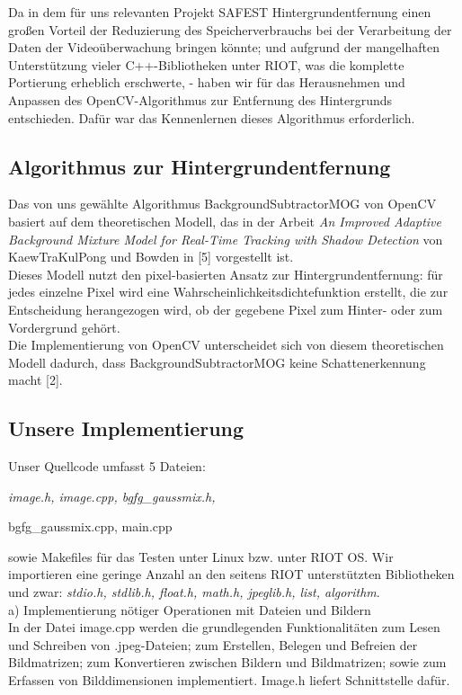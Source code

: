 \documentclass[10pt,a4paper]{article}
\begin{document}
Da in dem für uns relevanten Projekt SAFEST Hintergrundentfernung einen großen Vorteil der Reduzierung des Speicherverbrauchs bei der Verarbeitung der Daten der Videoüberwachung bringen könnte; und aufgrund der mangelhaften Unterstützung vieler C++-Bibliotheken unter RIOT, was die komplette Portierung erheblich erschwerte, - haben wir für das Herausnehmen und Anpassen des OpenCV-Algorithmus zur Entfernung des Hintergrunds entschieden. Dafür war das Kennenlernen dieses Algorithmus erforderlich. 

\subsection{Algorithmus zur Hintergrundentfernung}

Das von uns gewählte Algorithmus BackgroundSubtractorMOG von OpenCV basiert auf dem theoretischen Modell, das in der Arbeit {\it An Improved Adaptive Background Mixture Model for Real-Time Tracking with Shadow Detection} von KaewTraKulPong und Bowden in [5] vorgestellt ist. \\

Dieses Modell nutzt den pixel-basierten Ansatz zur Hintergrundentfernung: für jedes einzelne Pixel wird eine Wahrscheinlichkeitsdichtefunktion erstellt, die zur Entscheidung herangezogen wird, ob der gegebene Pixel zum Hinter- oder zum Vordergrund gehört. \\

Die Implementierung von OpenCV unterscheidet sich von diesem theoretischen Modell dadurch, dass BackgroundSubtractorMOG keine Schattenerkennung macht [2]. 

\subsection{Unsere Implementierung}

Unser Quellcode umfasst 5 Dateien: {\it image.h, image.cpp, bgfg\_gaussmix.h,

 bgfg\_gaussmix.cpp, main.cpp} sowie Makefiles für das Testen unter Linux bzw. unter RIOT OS. Wir importieren eine geringe Anzahl an den seitens RIOT unterstützten Bibliotheken und zwar: {\it stdio.h, stdlib.h, float.h, math.h, jpeglib.h, list, algorithm}. \\

a) Implementierung nötiger Operationen mit Dateien und Bildern \\

In der Datei image.cpp werden die grundlegenden Funktionalitäten zum Lesen und Schreiben von .jpeg-Dateien; zum Erstellen, Belegen und Befreien der Bildmatrizen; zum Konvertieren zwischen Bildern und Bildmatrizen; sowie zum Erfassen von Bilddimensionen implementiert. Image.h liefert Schnittstelle dafür. \\
\end{document}
